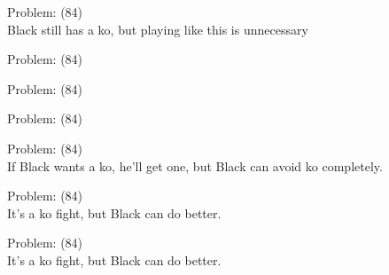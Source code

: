 \documentclass[11pt]{article}
\begin{document}
\begin{minipage}[t]{0.5\textwidth}
  {\centering
  
Problem: (84)\\
Black still has a ko, but playing like this is unnecessary\\
  }
\end{minipage}
\begin{minipage}[t]{0.5\textwidth}
  {\centering
  
Problem: (84)\\
  }
\end{minipage}
\begin{minipage}[t]{0.5\textwidth}
  {\centering
  
Problem: (84)\\
  }
\end{minipage}
\begin{minipage}[t]{0.5\textwidth}
  {\centering
  
Problem: (84)\\
  }
\end{minipage}
\begin{minipage}[t]{0.5\textwidth}
  {\centering
  
Problem: (84)\\
If Black wants a ko, he'll get one, but Black can avoid ko completely.\\
  }
\end{minipage}
\begin{minipage}[t]{0.5\textwidth}
  {\centering
  
Problem: (84)\\
It's a ko fight, but Black can do better.\\
  }
\end{minipage}
\begin{minipage}[t]{0.5\textwidth}
  {\centering
  
Problem: (84)\\
It's a ko fight, but Black can do better.\\
  }
\end{minipage}
\end{document}
